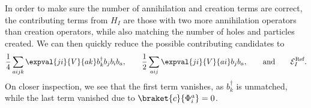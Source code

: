 \begin{comment}
    Considering the one-body part, we have
    \begin{align*}
        \expval{c}{\hat{H}_0}{\Phi_i^a} &= \sum_{\alpha\beta} \expval{\alpha}{\hat{h}_0}{\beta} \expval{c}{a_\alpha^\dagger a_\beta}{\Phi_i^a} \\
        &= \sum_{\alpha\beta} \expval{\alpha}{\hat{h}_0}{\beta} \expval{c}{a_\alpha^\dagger a_\beta a_a^\dagger a_i}{c}. \\
    \end{align*}
    The only possible contraction is
    \begin{equation*}
        \langle
        \wick{
            c
            \vert
            \c2 a_\alpha^\dagger \c1 a_\beta \c1 a_a^\dagger \c2 a_i
            \vert
            c
        }
        \rangle,
    \end{equation*}
    such that $\alpha = i$ and $\beta = a$.
    The expectation value of the one-body part is then
    \begin{equation*}
        \expval{c}{\hat{H}_0}{\Phi_i^a} = \sum_{\alpha \beta} \expval{\alpha}{\hat{h}_0}{\beta} \delta_{\alpha i} \delta_{\beta a} = \expval{i}{\hat{h}_0}{a} = 0,
    \end{equation*}
    which vanishes due to the $\delta_{ij}$ term of Eq.~\eqref{eq:onebody}.
\end{comment}

In order to make sure the number of annihilation and creation terms are correct, the contributing terms from $H_I$ are those with two more annihilation operators than creation operators, while also matching the number of holes and particles created.
We can then quickly reduce the possible contributing candidates to
\begin{equation*}
    \frac{1}{4} \sum_{aijk} \expval{ji}{V}{ak} b_k^\dagger b_j b_i b_a, \qquad
    \frac{1}{2} \sum_{aij} \expval{ji}{V}{ai} b_j b_a, \qquad
    \text{and} \qquad \mathcal{E}_I^\text{Ref}.
\end{equation*}
On closer inspection, we see that the first term vanishes, as $b_k^\dagger$ is unmatched, while the last term vanished due to $\braket{c}{\Phi_i^a} = 0$.

